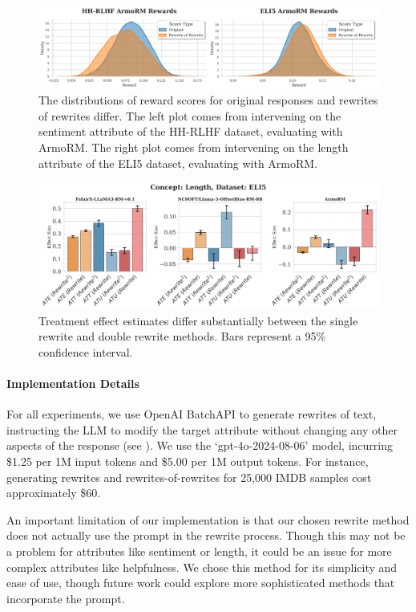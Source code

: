 \documentclass{article}
\begin{document}
\begin{figure}[t]
  \centering
  \includegraphics[width=\linewidth]{figures/kde.png}
  \caption{The distributions of reward scores for original responses and rewrites of rewrites differ. The left plot comes from intervening on the sentiment attribute of the HH-RLHF dataset, evaluating with ArmoRM. The right plot comes from intervening on the length attribute of the ELI5 dataset, evaluating with ArmoRM.}
  \label{fig:kde}
\end{figure}

\begin{figure}[t]
  \centering
  \includegraphics[width=\linewidth]{figures/comp3.png}
  \caption{Treatment effect estimates differ substantially between the single rewrite and double rewrite methods. Bars represent a 95\% confidence interval.}
  \label{fig:bias}
\end{figure}

\paragraph{Implementation Details}

For all experiments, we use OpenAI BatchAPI to generate rewrites of text, instructing the LLM to modify the target attribute without changing any other aspects of the response (see ). We use the `gpt-4o-2024-08-06' model, incurring \$1.25 per 1M input tokens and \$5.00 per 1M output tokens. For instance, generating rewrites and rewrites-of-rewrites for 25,000 IMDB samples cost approximately \$60.

An important limitation of our implementation is that our chosen rewrite method does not actually use the prompt in the rewrite process. Though this may not be a problem for attributes like sentiment or length, it could be an issue for more complex attributes like helpfulness. We chose this method for its simplicity and ease of use, though future work could explore more sophisticated methods that incorporate the prompt.
\end{document}
